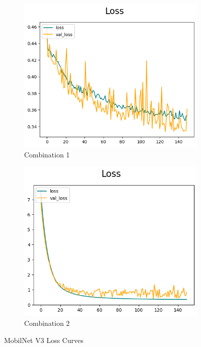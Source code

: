 \begin{figure}
    \centering
    \begin{subfigure}[b]{0.4\textwidth}
        \centering
        \includegraphics[width=\textwidth]{Figures/unbalanced_data/without bn/mn3/loss.png}
        \caption{Combination 1}
        \label{fig:u_wo_r_l}
    \end{subfigure}
    \begin{subfigure}[b]{0.4\textwidth}
        \centering
        \includegraphics[width=\textwidth]{Figures/unbalanced_data/with bn/mn3/loss.png}
        \caption{Combination 2}
        \label{fig:u_w_r_l}
    \end{subfigure}
    \caption{MobilNet V3 Loss Curves}
\end{figure}

